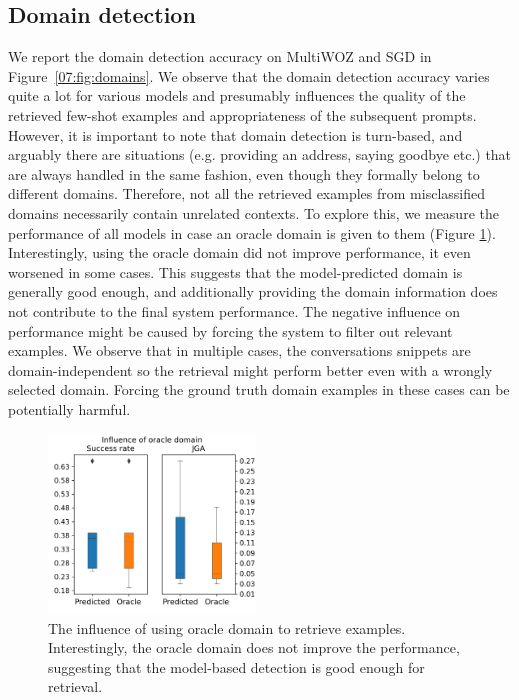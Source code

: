 \subsection{Domain detection}
\label{subsec:domain}
We report the domain detection accuracy on MultiWOZ and SGD
in Figure~\ref{07:fig:domains}.
We observe that the domain detection accuracy varies quite a lot for various models and presumably influences the quality of the retrieved few-shot examples and appropriateness of the subsequent prompts.
However, it is important to note that domain detection is turn-based, and arguably there are situations (e.g. providing an address, saying goodbye etc.) that are always handled in the same fashion, even though they formally belong to different domains.
Therefore, not all the retrieved examples from misclassified domains necessarily contain unrelated contexts.
To explore this, we measure the performance of all models in case an oracle domain is given to them (Figure \ref{fig:oracle_domains}).
Interestingly, using the oracle domain did not improve performance, it even worsened in some cases.
This suggests that the model-predicted domain is generally good enough, and additionally providing the domain information does not contribute to the final system performance.
The negative influence on performance might be caused by forcing the system to filter out relevant examples.
We observe that in multiple cases, the conversations snippets are domain-independent so the retrieval might perform better even with a wrongly selected domain.
Forcing the ground truth domain examples in these cases can be potentially harmful.

\begin{figure}[h]
    \centering
    \includegraphics[width=0.49\textwidth]{images/oracle_domains.png}
    \caption{The influence of using oracle domain to retrieve examples. Interestingly, the oracle domain does not improve the performance, suggesting that the model-based detection is good enough for retrieval.}
    \label{fig:oracle_domains}
\end{figure}

